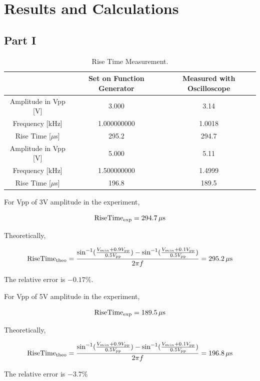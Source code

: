 \documentclass[a4paper]{report}
\begin{document}
\section{Results and Calculations}
\subsection{Part I}
\begin{table}[H]
	\centering
	\begin{tabular}{|c|c|c|}
		\hline
		                     & Set on Function Generator & Measured with Oscilloscope \\
		\hline
		Amplitude in Vpp [V] & 3.000                     & 3.14                       \\
		\hline
		Frequency [kHz]      & 1.000000000               & 1.0018                     \\
		\hline
		Rise Time [$\mu$s]   & 295.2                     & 294.7                      \\
		\hline
		Amplitude in Vpp [V] & 5.000                     & 5.11                       \\
		\hline
		Frequency [kHz]      & 1.500000000               & 1.4999                     \\
		\hline
		Rise Time [$\mu$s]   & 196.8                     & 189.5                        \\
		\hline
	\end{tabular}
	\caption{Rise Time Measurement.}
\end{table}
For Vpp of 3V amplitude in the experiment,

$$\mathrm{RiseTime_{exp}}=294.7\,\rm \mu s$$

Theoretically,

$$\mathrm{RiseTime_{theo}}=\dfrac{\sin^{-1}(\frac{V_{min}+0.9V_{\rm{pp}}}{0.5V_{\rm{pp}}})-\sin^{-1}(\frac{V_{min}+0.1V_{\rm{pp}}}{0.5V_{\rm{pp}}})}{2\pi f}=295.2\,\rm \mu s$$

The relative error is $-0.17\%$.

For Vpp of 5V amplitude in the experiment,

$$\mathrm{RiseTime_{exp}}=189.5\,\rm \mu s$$

Theoretically,

$$\mathrm{RiseTime_{theo}}=\dfrac{\sin^{-1}(\frac{V_{min}+0.9V_{\rm{pp}}}{0.5V_{\rm{pp}}})-\sin^{-1}(\frac{V_{min}+0.1V_{\rm{pp}}}{0.5V_{\rm{pp}}})}{2\pi f}=196.8\,\rm \mu s$$

The relative error is $-3.7\%$
\end{document}
